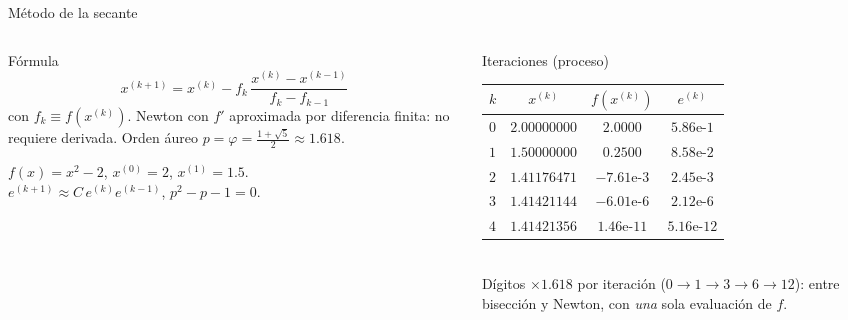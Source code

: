 \documentclass[aspectratio=169,10pt]{beamer}
\begin{document}
\begin{frame}{Método de la secante}
\begin{columns}[T]
\begin{column}{0.42\textwidth}
\begin{cardidea}{Fórmula}{\faSuperscript}
{\footnotesize$$x^{(k+1)}=x^{(k)}-f_k\,\frac{x^{(k)}-x^{(k-1)}}{f_k-f_{k-1}}$$}
{\footnotesize con $f_k\equiv f(x^{(k)})$. Newton con $f'$ aproximada por diferencia finita: no requiere derivada. Orden áureo $p=\varphi=\tfrac{1+\sqrt5}{2}\approx1.618$.}
\end{cardidea}
\vspace{1mm}
\begin{cardnota}[\faListOl]
{\footnotesize $f(x)=x^2-2$, $x^{(0)}=2$, $x^{(1)}=1.5$.\\[0.4mm]
$e^{(k+1)}\approx C\,e^{(k)}e^{(k-1)}$, $p^2{-}p{-}1{=}0$.}
\end{cardnota}
\end{column}
\begin{column}{0.56\textwidth}
\begin{cardgear}{Iteraciones (proceso)}{\faTable}
\centering
{\footnotesize\renewcommand{\arraystretch}{1.22}\setlength{\tabcolsep}{2pt}
\begin{tabular}{c|ccc}
$k$ & $x^{(k)}$ & $f(x^{(k)})$ & $e^{(k)}$\\\hline
$0$&$2.00000000$&$2.0000$&$5.86\text{e-}1$\\
$1$&$1.50000000$&$0.2500$&$8.58\text{e-}2$\\
$2$&$1.41176471$&$-7.61\text{e-}3$&$2.45\text{e-}3$\\
$3$&$1.41421144$&$-6.01\text{e-}6$&$2.12\text{e-}6$\\
$4$&$1.41421356$&$1.46\text{e-}11$&$5.16\text{e-}12$\\
\end{tabular}}\\[1.2mm]
{\footnotesize Dígitos $\times1.618$ por iteración ($0{\to}1{\to}3{\to}6{\to}12$): entre bisección y Newton, con \emph{una} sola evaluación de $f$.}
\end{cardgear}
\end{column}
\end{columns}
\end{frame}
\end{document}

